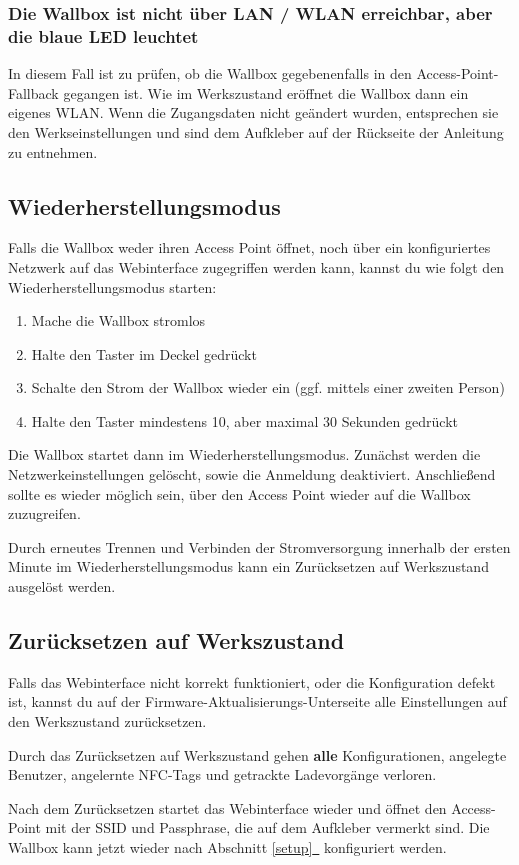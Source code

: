 \documentclass[a4paper,10pt]{article}
\newcommand{\hint}[1]{\begin{tcolorbox}[colback=boxgray,colframe=black,coltext=
white,title=Hinweis,left*=2mm,right*=2mm,boxsep=1mm,bottom=1mm,top=1mm]#1\end{tcolorbox}}
\newcommand*{\fullref}[1]{Abschnitt \hyperref[{#1}]{\ref*{#1}~\nameref*{#1}}}
\begin{document}
\begin{multicols*}{2}
    \subsubsection*{Die Wallbox ist nicht über LAN / WLAN erreichbar, aber die blaue LED leuchtet}
    In diesem Fall ist zu prüfen, ob die Wallbox gegebenenfalls in den Access-Point-Fallback
    gegangen ist. Wie im Werkszustand eröffnet die Wallbox dann ein eigenes
    WLAN. Wenn die Zugangsdaten nicht geändert wurden, entsprechen sie den Werkseinstellungen und sind dem
    Aufkleber auf der Rückseite der Anleitung zu entnehmen.


    \subsection{Wiederherstellungsmodus}\label{recovery}
    Falls die Wallbox weder ihren Access Point öffnet, noch über ein konfiguriertes Netzwerk auf das Webinterface zugegriffen werden kann,
    kannst du wie folgt den Wiederherstellungsmodus starten:
    \begin{enumerate}
     \item Mache die Wallbox stromlos
     \item Halte den Taster im Deckel gedrückt
     \item Schalte den Strom der Wallbox wieder ein (ggf. mittels einer zweiten Person)
     \item Halte den Taster mindestens 10, aber maximal 30 Sekunden gedrückt
    \end{enumerate}
    Die Wallbox startet dann im Wiederherstellungsmodus. Zunächst werden die Netzwerkeinstellungen gelöscht, sowie die Anmeldung deaktiviert.
    Anschließend sollte es wieder möglich sein, über den Access Point wieder auf die Wallbox zuzugreifen.

    Durch erneutes Trennen und Verbinden der Stromversorgung innerhalb der ersten Minute im Wiederherstellungsmodus kann ein Zurücksetzen auf Werkszustand ausgelöst werden.

    \subsection{Zurücksetzen auf Werkszustand}\label{reset}
    Falls das Webinterface nicht korrekt funktioniert, oder die Konfiguration defekt ist,
    kannst du auf der Firmware-Aktualisierungs-Unterseite alle Einstellungen auf den Werkszustand zurücksetzen.
    \hint{Durch das Zurücksetzen auf Werkszustand gehen \mbox{\textbf{alle}} Konfigurationen, angelegte Benutzer, angelernte NFC-Tags und getrackte Ladevorgänge verloren.}
    Nach dem Zurücksetzen startet das Webinterface wieder und öffnet
    den Access-Point mit der SSID und Passphrase, die auf dem Aufkleber vermerkt
    sind. Die Wallbox kann jetzt wieder nach \fullref{setup} konfiguriert werden.


\end{multicols*}
\end{document}
